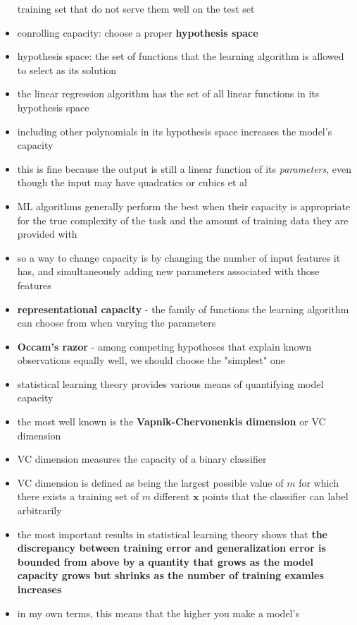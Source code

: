 \documentclass[11pt, twocolumn]{report}
\begin{document}
\begin{itemize}
    training set that do not serve them well on the test set
  \item conrolling capacity: choose a proper \textbf{hypothesis space}
  \item hypothesis space: the set of functions that the learning algorithm is
    allowed to select as its solution
  \item the linear regression algorithm has the set of all linear functions in
    its hypothesis space
  \item including other polynomials in its hypothesis space increases the
    model's capacity    
  \item this is fine because the output is still a linear function of its
    \textit{parameters}, even though the input may have quadratics or cubics et
    al
  \item ML algorithms generally perform the best when their capacity is
    appropriate for the true complexity of the task and the amount of training
    data they are provided with
  \item so a way to change capacity is by changing the number of input features
    it has, and simultaneously adding new parameters associated with those
    features
  \item \textbf{representational capacity} - the family of functions the
    learning algorithm can choose from when varying the parameters 
  \item \textbf{Occam's razor} - among competing hypotheses that explain known
    observations equally well, we should choose the "simplest" one
  \item statistical learning theory provides various means of quantifying model
    capacity
  \item the most well known is the \textbf{Vapnik-Chervonenkis dimension} or VC
    dimension
  \item VC dimension measures the capacity of a binary classifier
  \item VC dimension is defined as being the largest possible value of $m$ for
    which there exists a training set of $m$ different $\bm{x}$ points that the
    classifier can label arbitrarily
  \item the most important results in statistical learning theory shows that
    \textbf{the discrepancy between training error and generalization error is
      bounded from above by a quantity that grows as the model capacity grows
      but shrinks as the number of training examles increases}
  \item in my own terms, this means that the higher you make a model's

\end{itemize}
\end{document}
